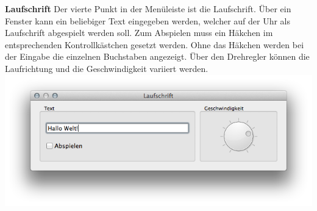 \begin{multicols}{2}
\textbf{Laufschrift}
Der vierte Punkt in der Menüleiste ist die Laufschrift. Über ein Fenster kann ein beliebiger Text eingegeben werden, welcher auf der Uhr als Laufschrift abgespielt werden soll. Zum Abspielen muss ein Häkchen im entsprechenden Kontrollkästchen gesetzt werden.
Ohne das Häkchen werden bei der Eingabe die einzelnen Buchstaben angezeigt. Über den Drehregler können die Laufrichtung und die Geschwindigkeit variiert werden.
\includegraphics[width=1\columnwidth]{Abbildungen/Software/Laufschrift}

\end{multicols}
